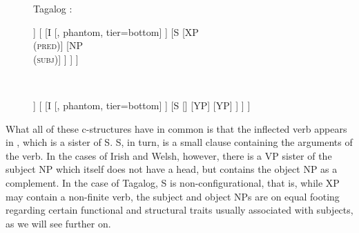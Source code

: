 \begin{figure}
\a Tagalog \citep[131]{kroeger1991}:\label{ex:tagalogcstruct}\medskip \\
\begin{minipage}[t]{.5\remaining}
\begin{forest}
[IP
	[SPEC
		[, phantom, tier=bottom]
	]
	[
		[I
			[, phantom, tier=bottom]
		]
		[S
			[{XP\\ (\textsc{pred})}]
			[{NP\\ (\textsc{subj})}]
		]
	]
]
\end{forest}
\end{minipage}
~
\begin{minipage}[t]{.5\remaining}
\begin{forest}
[IP
	[SPEC
		[, phantom, tier=bottom]
	]
	[
		[I
			[, phantom, tier=bottom]
		]
		[S
			[]
			[YP]
			[YP]
		]
	]
]
\end{forest}
\end{minipage}
\xe
\end{figure}

What all of these c-structures have in common is that the inflected verb
appears in , which is a sister of S. S, in turn, is a small clause
containing the arguments of the verb. In the cases of Irish and Welsh, however,
there is a VP sister of the subject NP which itself does not have a head, but
contains the object NP as a complement. In the case of Tagalog, S is
non-configurational, that is, while XP may contain a non-finite verb, the
subject and object NPs are on equal footing regarding certain functional
and structural traits usually associated with subjects, as we will see further
on.

